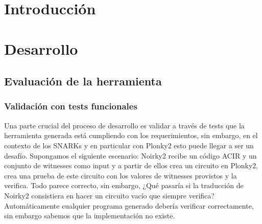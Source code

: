 \documentclass[11pt,a4paper]{tesis}
\begin{document}

\def\autor{Bruno Weisz}
\def\tituloTesis{Demostrando la ejecución de un  \vspace{.2cm} \\ programa de alto nivel con Plonky2}
\def\runtitulo{Demostrando la correcta ejecución de un programa de alto nivel con Plonky2}
\def\runtitle{}
\def\director{Agustín Garassino}
\def\codirector{Matías López y Rosenfeld}
\def\lugar{Buenos Aires, 2025}


\frontmatter
\pagestyle{empty}



\newpage
\newpage
\tableofcontents

\mainmatter
\pagestyle{headings}


\part{Introducción}






\part{Desarrollo}






\chapter{Evaluación de la herramienta}


\section{Validación con tests funcionales}\label{sec:tests}
Una parte crucial del proceso de desarrollo es validar a través de tests que la herramienta generada está cumpliendo con los requerimientos, sin embargo, en el contexto de los SNARKs y en particular con Plonky2 esto puede llegar a ser un desafío. Supongamos el siguiente escenario: Noirky2 recibe un código ACIR y un conjunto de witnesses como input y a partir de ellos crea un circuito en Plonky2, crea una prueba de este circuito con los valores de witnesses provistos y la verifica. Todo parece correcto, sin embargo, ¿Qué pasaría si la traducción de Noirky2 consistiera en hacer un circuito vacío que siempre verifica? Automáticamente cualquier programa generado debería verificar correctamente, sin embargo sabemos que la implementación no existe. 
\end{document}
